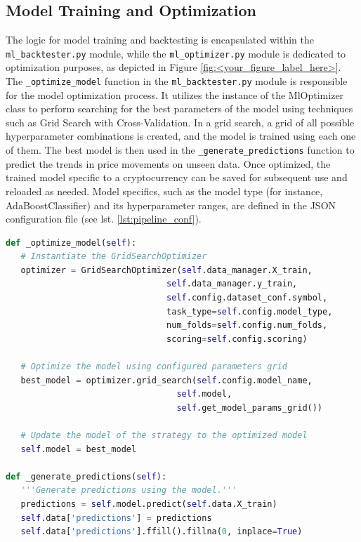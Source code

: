 \subsection{Model Training and Optimization}
The logic for model training and backtesting is encapsulated within the \texttt{ml\_backtester.py} module,
while the \texttt{ml\_optimizer.py} module is dedicated to optimization purposes, as depicted in Figure \ref{fig:<your_figure_label_here>}.
The \texttt{\_optimize\_model} function in the \texttt{ml\_backtester.py} module is responsible for the model optimization process.
It utilizes the instance of the MlOptimizer class to perform searching for the best parameters of the model using techniques such as Grid Search with Cross-Validation.
In a grid search, a grid of all possible hyperparameter combinations is created, and the model is trained using each one of them. The best model is then used in the \texttt{\_generate\_predictions}
function to predict the trends in price movements on unseen data. Once optimized, the trained model specific to a cryptocurrency can be saved for subsequent use and reloaded as needed.
Model specifics, such as the model type (for instance, AdaBoostClassifier) and its hyperparameter ranges, are defined in the JSON configuration file (see lst. \ref{lst:pipeline_conf}).


\noindent\begin{minipage}{\linewidth}
\begin{lstlisting}[style=pythonstyle, language=Python, caption={Function of MlBacktester class for model optimization and predictions.},  captionpos=b, label=lst:add_features_function]
def _optimize_model(self):
   # Instantiate the GridSearchOptimizer
   optimizer = GridSearchOptimizer(self.data_manager.X_train,
                                self.data_manager.y_train,
                                self.config.dataset_conf.symbol,
                                task_type=self.config.model_type,
                                num_folds=self.config.num_folds,
                                scoring=self.config.scoring)

   # Optimize the model using configured parameters grid
   best_model = optimizer.grid_search(self.config.model_name,
                                  self.model,
                                  self.get_model_params_grid())

   # Update the model of the strategy to the optimized model
   self.model = best_model

def _generate_predictions(self):
   '''Generate predictions using the model.'''
   predictions = self.model.predict(self.data.X_train)
   self.data['predictions'] = predictions
   self.data['predictions'].ffill().fillna(0, inplace=True)

\end{lstlisting}
\end{minipage}


